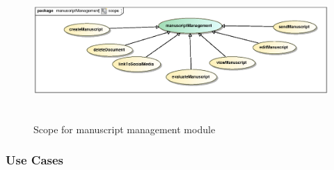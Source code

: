 \documentclass[12pt]{article}
\begin{document}
\begin{figure}[h]
	\includegraphics[height=200px, width=500px]{epsImages/ManuscriptManagement/scope.eps}
	\caption{Scope for manuscript management module}
\end{figure}

\newpage
\subsubsection{Use Cases}
\end{document}
